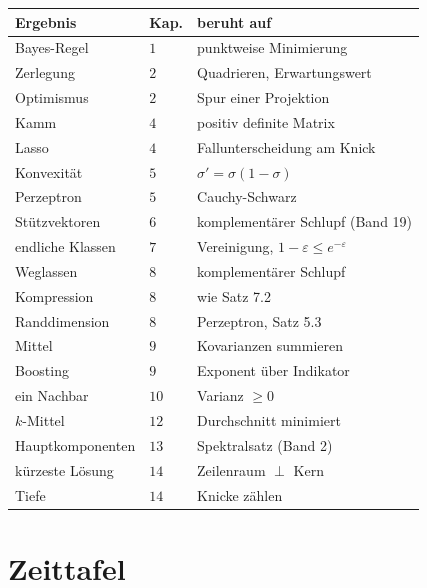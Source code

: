 \begin{merksatz}
\begin{center}
{\small
\renewcommand{\arraystretch}{1.4}
\begin{tabular}{@{}P{3.4cm}P{1.0cm}P{3.8cm}@{}}
\toprule
\textbf{Ergebnis} & \textbf{Kap.} & \textbf{beruht auf}\\
\midrule
Bayes-Regel & $1$ & punktweise Minimierung\\
Zerlegung & $2$ & Quadrieren, Erwartungswert\\
Optimismus & $2$ & Spur einer Projektion\\
Kamm & $4$ & positiv definite Matrix\\
Lasso & $4$ & Fallunterscheidung am Knick\\
Konvexität & $5$ & $\sigma' = \sigma(1-\sigma)$\\
Perzeptron & $5$ & Cauchy-Schwarz\\
Stützvektoren & $6$ & komplementärer Schlupf (Band 19)\\
endliche Klassen & $7$ & Vereinigung, $1-\varepsilon \le e^{-\varepsilon}$\\
Weglassen & $8$ & komplementärer Schlupf\\
Kompression & $8$ & wie Satz 7.2\\
Randdimension & $8$ & Perzeptron, Satz 5.3\\
Mittel & $9$ & Kovarianzen summieren\\
Boosting & $9$ & Exponent über Indikator\\
ein Nachbar & $10$ & Varianz $\ge 0$\\
$k$-Mittel & $12$ & Durchschnitt minimiert\\
Hauptkomponenten & $13$ & Spektralsatz (Band 2)\\
kürzeste Lösung & $14$ & Zeilenraum $\perp$ Kern\\
Tiefe & $14$ & Knicke zählen\\
\bottomrule
\end{tabular}}
\end{center}
\end{merksatz}

\section{Zeittafel}

